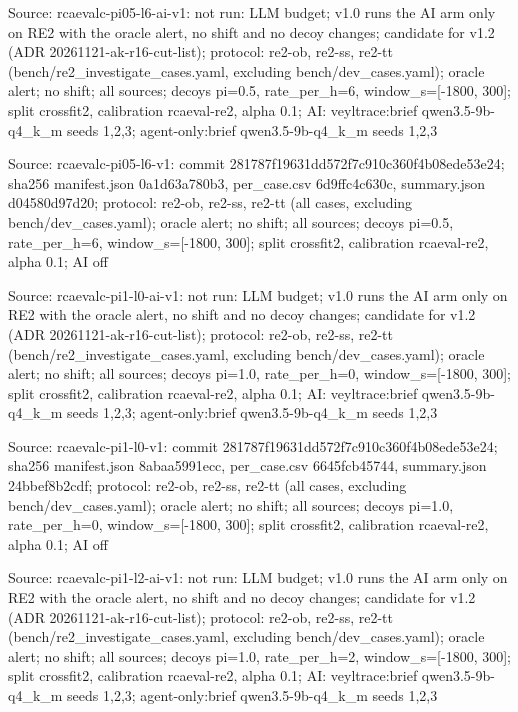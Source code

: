 \noindent Source: rcaevalc-pi05-l6-ai-v1: not run: LLM budget; v1.0 runs the AI arm only on RE2 with the oracle alert, no shift and no decoy changes; candidate for v1.2 (ADR 20261121-ak-r16-cut-list); protocol: re2-ob, re2-ss, re2-tt (bench/\allowbreak{}re2\_investigate\_cases.yaml, excluding bench/\allowbreak{}dev\_cases.yaml); oracle alert; no shift; all sources; decoys pi=0.5, rate\_per\_h=6, window\_s=[-1800, 300]; split crossfit2, calibration rcaeval-re2, alpha 0.1; AI: veyltrace:brief qwen3.5-9b-q4\_k\_m seeds 1,2,3; agent-only:brief qwen3.5-9b-q4\_k\_m seeds 1,2,3\par
\noindent Source: rcaevalc-pi05-l6-v1: commit 281787f19631dd572f7c910c360f4b08ede53e24; sha256 manifest.json 0a1d63a780b3, per\_case.csv 6d9ffc4c630c, summary.json d04580d97d20; protocol: re2-ob, re2-ss, re2-tt (all cases, excluding bench/\allowbreak{}dev\_cases.yaml); oracle alert; no shift; all sources; decoys pi=0.5, rate\_per\_h=6, window\_s=[-1800, 300]; split crossfit2, calibration rcaeval-re2, alpha 0.1; AI off\par
\noindent Source: rcaevalc-pi1-l0-ai-v1: not run: LLM budget; v1.0 runs the AI arm only on RE2 with the oracle alert, no shift and no decoy changes; candidate for v1.2 (ADR 20261121-ak-r16-cut-list); protocol: re2-ob, re2-ss, re2-tt (bench/\allowbreak{}re2\_investigate\_cases.yaml, excluding bench/\allowbreak{}dev\_cases.yaml); oracle alert; no shift; all sources; decoys pi=1.0, rate\_per\_h=0, window\_s=[-1800, 300]; split crossfit2, calibration rcaeval-re2, alpha 0.1; AI: veyltrace:brief qwen3.5-9b-q4\_k\_m seeds 1,2,3; agent-only:brief qwen3.5-9b-q4\_k\_m seeds 1,2,3\par
\noindent Source: rcaevalc-pi1-l0-v1: commit 281787f19631dd572f7c910c360f4b08ede53e24; sha256 manifest.json 8abaa5991ecc, per\_case.csv 6645fcb45744, summary.json 24bbef8b2cdf; protocol: re2-ob, re2-ss, re2-tt (all cases, excluding bench/\allowbreak{}dev\_cases.yaml); oracle alert; no shift; all sources; decoys pi=1.0, rate\_per\_h=0, window\_s=[-1800, 300]; split crossfit2, calibration rcaeval-re2, alpha 0.1; AI off\par
\noindent Source: rcaevalc-pi1-l2-ai-v1: not run: LLM budget; v1.0 runs the AI arm only on RE2 with the oracle alert, no shift and no decoy changes; candidate for v1.2 (ADR 20261121-ak-r16-cut-list); protocol: re2-ob, re2-ss, re2-tt (bench/\allowbreak{}re2\_investigate\_cases.yaml, excluding bench/\allowbreak{}dev\_cases.yaml); oracle alert; no shift; all sources; decoys pi=1.0, rate\_per\_h=2, window\_s=[-1800, 300]; split crossfit2, calibration rcaeval-re2, alpha 0.1; AI: veyltrace:brief qwen3.5-9b-q4\_k\_m seeds 1,2,3; agent-only:brief qwen3.5-9b-q4\_k\_m seeds 1,2,3\par

